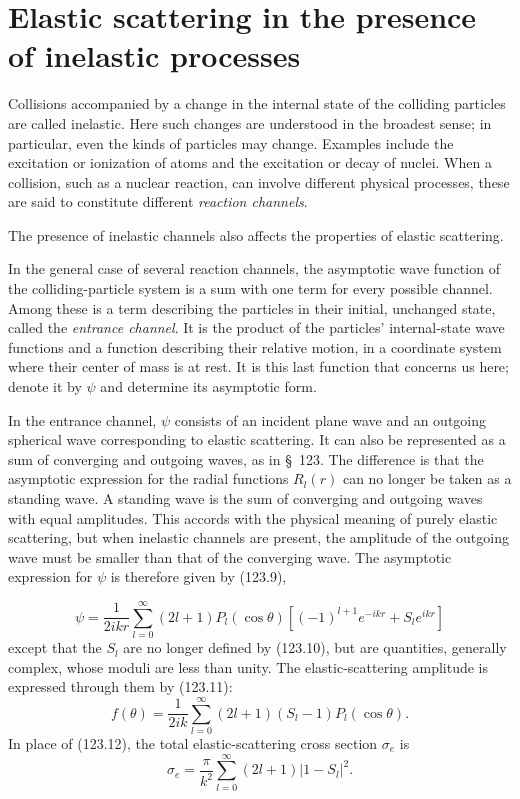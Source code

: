 \section{Elastic scattering in the presence of inelastic processes}

Collisions accompanied by a change in the internal state of the colliding particles are called inelastic. Here such changes are understood in the broadest sense; in particular, even the kinds of particles may change. Examples include the excitation or ionization of atoms and the excitation or decay of nuclei. When a collision, such as a nuclear reaction, can involve different physical processes, these are said to constitute different \emph{reaction channels}.

The presence of inelastic channels also affects the properties of elastic scattering.

In the general case of several reaction channels, the asymptotic wave function of the colliding-particle system is a sum with one term for every possible channel. Among these is a term describing the particles in their initial, unchanged state, called the \emph{entrance channel}. It is the product of the particles' internal-state wave functions and a function describing their relative motion, in a coordinate system where their center of mass is at rest. It is this last function that concerns us here; denote it by $\psi$ and determine its asymptotic form.

In the entrance channel, $\psi$ consists of an incident plane wave and an outgoing spherical wave corresponding to elastic scattering. It can also be represented as a sum of converging and outgoing waves, as in §~123. The difference is that the asymptotic expression for the radial functions $R_l(r)$ can no longer be taken as a standing wave. A standing wave is the sum of converging and outgoing waves with equal amplitudes. This accords with the physical meaning of purely elastic scattering, but when inelastic channels are present, the amplitude of the outgoing wave must be smaller than that of the converging wave. The asymptotic expression for $\psi$ is therefore given by (123.9),

\begin{equation}
 \psi=\frac1{2ikr}\sum_{l=0}^{\infty}(2l+1)P_l(\cos\theta)
 \left[(-1)^{l+1}e^{-ikr}+S_le^{ikr}\right]
 \tag{142.1}
\end{equation}
except that the $S_l$ are no longer defined by (123.10), but are quantities, generally complex, whose moduli are less than unity. The elastic-scattering amplitude is expressed through them by (123.11):
\begin{equation}
 f(\theta)=\frac1{2ik}\sum_{l=0}^{\infty}(2l+1)(S_l-1)P_l(\cos\theta).
 \tag{142.2}
\end{equation}
In place of (123.12), the total elastic-scattering cross section $\sigma_e$ is
\begin{equation}
 \sigma_e=\frac{\pi}{k^2}\sum_{l=0}^{\infty}(2l+1)|1-S_l|^2.
 \tag{142.3}
\end{equation}


